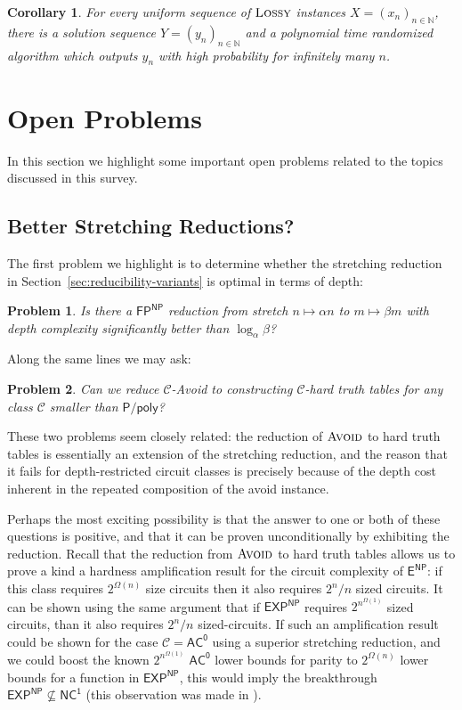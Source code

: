 \documentclass[11pt]{article}
\newtheorem{corollary}{Corollary}
\newtheorem{problem}{Problem}
\newcommand{\avoid}{\textsc{Avoid}}
\newcommand{\lossy}{\textsc{Lossy}}
\begin{document}
\begin{corollary}
For every uniform sequence of $\lossy$ instances $X= (x_n)_{n \in \mathbb{N}}$, there is a solution sequence $Y = (y_{n})_{n \in \mathbb{N}}$ and a polynomial time randomized algorithm which outputs $y_n$ with high probability for infinitely many $n$.
\end{corollary}
\section{Open Problems}\label{sec:open}

In this section we highlight some important open problems related to the topics discussed in this survey.
\subsection{Better Stretching Reductions?}

The first problem we highlight is to determine whether the stretching reduction in Section~\ref{sec:reducibility-variants} is optimal in terms of depth:
\begin{problem}
Is there a $\mathsf{FP^{NP}}$ reduction from stretch $n \mapsto \alpha n$ to $m \mapsto \beta m$ with depth complexity significantly better than $\log_{\alpha}\beta$? 
\end{problem}
Along the same lines we may ask:
\begin{problem}
Can we reduce $\mathcal{C}$-Avoid to constructing $\mathcal{C}$-hard truth tables for any class $\mathcal{C}$ smaller than $\mathsf{P/poly}$?  
\end{problem}
These two problems seem closely related: the reduction of $\avoid$ to hard truth tables is essentially an extension of the stretching reduction, and the reason that it fails for depth-restricted circuit classes is precisely because of the depth cost inherent in the repeated composition of the avoid instance.

Perhaps the most exciting possibility is that the answer to one or both of these questions is positive, and that it can be proven unconditionally by exhibiting the reduction. Recall that the reduction from $\avoid$ to hard truth tables allows us to prove a kind a hardness amplification result for the circuit complexity of $\mathsf{E^{NP}}$: if this class requires $2^{\Omega(n)}$ size circuits then it also requires $2^n/n$ sized circuits. It can be shown using the same argument that if $\mathsf{EXP^{NP}}$ requires $2^{n^{\Omega(1)}}$ sized circuits, than it also requires $2^n/n$ sized-circuits. If such an amplification result could be shown for the case $\mathcal{C}=\mathsf{AC^0}$ using a superior stretching reduction, and we could boost the known $2^{n^{\Omega(1)}}$ $\mathsf{AC^0}$ lower bounds for parity to $2^{\Omega(n)}$ lower bounds for a function in $\mathsf{EXP^{NP}}$, this would imply the breakthrough $\mathsf{EXP^{NP}} \not\subseteq \mathsf{NC^1}$ (this observation was made in \cite{RSW}).
\end{document}
